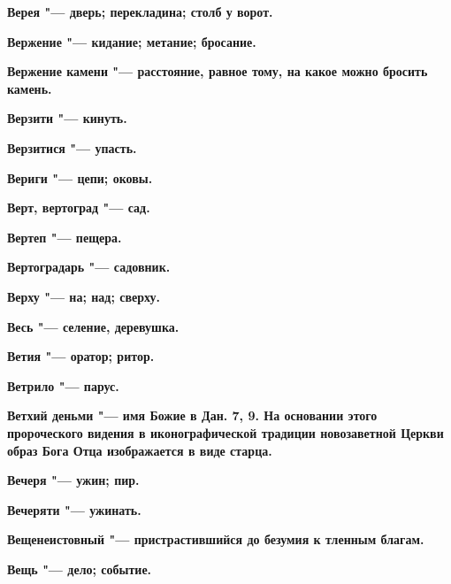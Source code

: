 \begin{mymulticols}{2}
\bfseries Верея\normalfont{} "--- дверь; перекладина; столб у ворот. 




\bfseries Вержение\normalfont{} "--- кидание; метание; бросание. 




\bfseries Вержение камени\normalfont{} "--- расстояние, равное тому, на какое можно бросить камень. 




\bfseries Верзити\normalfont{} "--- кинуть. 




\bfseries Верзитися\normalfont{} "--- упасть. 




\bfseries Вериги\normalfont{} "--- цепи; оковы. 




\bfseries Верт, вертоград\normalfont{} "--- сад. 




\bfseries Вертеп\normalfont{} "--- пещера. 




\bfseries Вертоградарь\normalfont{} "--- садовник. 




\bfseries Верху\normalfont{} "--- на; над; сверху. 




\bfseries Весь\normalfont{} "--- селение, деревушка. 




\bfseries Ветия\normalfont{} "--- оратор; ритор. 




\bfseries Ветрило\normalfont{} "--- парус. 




\bfseries Ветхий деньми\normalfont{} "--- имя Божие в Дан. 7, 9. На основании этого пророческого видения в иконографической традиции новозаветной Церкви образ Бога Отца изображается в виде старца. 




\bfseries Вечеря\normalfont{} "--- ужин; пир. 




\bfseries Вечеряти\normalfont{} "--- ужинать. 




\bfseries Вещенеистовный\normalfont{} "--- пристрастившийся до безумия к тленным благам. 




\bfseries Вещь\normalfont{} "--- дело; событие. 





\end{mymulticols}
